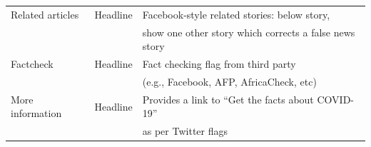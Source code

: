 \documentclass[letterpaper, 12pt, parskip=full,]{scrartcl}
\begin{document}
\begin{table}[H]
\begin{tabular}{l|l|l}
Related articles                                                                                                       & Headline                                                                                                     & Facebook-style related stories: below story,\\ & & show one other story which corrects a false news story                                                                                                                                                                                                                                                                                             \\
Factcheck                                                                                                      & Headline                                                                                                     & Fact checking flag from third party\\ & & (e.g., Facebook, AFP, AfricaCheck, etc)
 \\
More information                                                                                                      & Headline                                                                                                     & Provides a link to ``Get the facts about COVID-19''\\ & & as per Twitter flags

\end{tabular}
\end{table}
\end{document}
